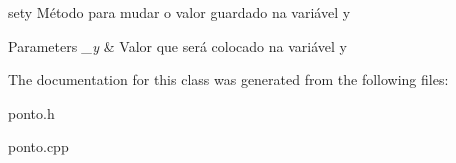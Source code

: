 sety Método para mudar o valor guardado na variável y 


\begin{DoxyParams}{Parameters}
{\em \+\_\+y} & Valor que será colocado na variável y \\
\hline
\end{DoxyParams}


The documentation for this class was generated from the following files\+:\begin{DoxyCompactItemize}
\item 
ponto.\+h\item 
ponto.\+cpp\end{DoxyCompactItemize}
